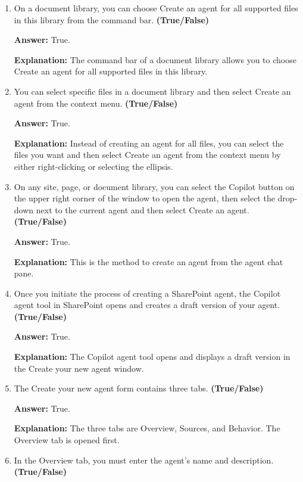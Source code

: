 \documentclass[10pt]{article}
\begin{document}
\begin{enumerate}[leftmargin=*]
\textbf{Answer:} True.

\textbf{Explanation:} On the SharePoint site's homepage, select +New and then select Agent from the drop-down menu.

\item On a document library, you can choose Create an agent for all supported files in this library from the command bar. \textbf{(True/False)}

\textbf{Answer:} True.

\textbf{Explanation:} The command bar of a document library allows you to choose Create an agent for all supported files in this library.

\item You can select specific files in a document library and then select Create an agent from the context menu. \textbf{(True/False)}

\textbf{Answer:} True.

\textbf{Explanation:} Instead of creating an agent for all files, you can select the files you want and then select Create an agent from the context menu by either right-clicking or selecting the ellipsis.

\item On any site, page, or document library, you can select the Copilot button on the upper right corner of the window to open the agent, then select the drop-down next to the current agent and then select Create an agent. \textbf{(True/False)}

\textbf{Answer:} True.

\textbf{Explanation:} This is the method to create an agent from the agent chat pane.

\item Once you initiate the process of creating a SharePoint agent, the Copilot agent tool in SharePoint opens and creates a draft version of your agent. \textbf{(True/False)}

\textbf{Answer:} True.

\textbf{Explanation:} The Copilot agent tool opens and displays a draft version in the Create your new agent window.

\item The Create your new agent form contains three tabs. \textbf{(True/False)}

\textbf{Answer:} True.

\textbf{Explanation:} The three tabs are Overview, Sources, and Behavior. The Overview tab is opened first.

\item In the Overview tab, you must enter the agent's name and description. \textbf{(True/False)}


\end{enumerate}
\end{document}
